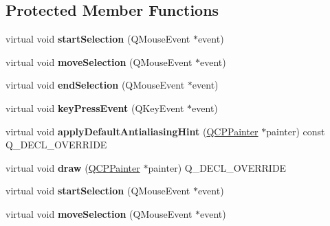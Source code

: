 \subsection*{Protected Member Functions}
\begin{DoxyCompactItemize}
\item 
virtual void {\bfseries start\+Selection} (Q\+Mouse\+Event $\ast$event)\hypertarget{class_q_c_p_selection_rect_a271f24cfca8bc50a0e2b4310ff90e227}{}\label{class_q_c_p_selection_rect_a271f24cfca8bc50a0e2b4310ff90e227}

\item 
virtual void {\bfseries move\+Selection} (Q\+Mouse\+Event $\ast$event)\hypertarget{class_q_c_p_selection_rect_a95c3f1700be2a6d7bba0fe56ece5fbb1}{}\label{class_q_c_p_selection_rect_a95c3f1700be2a6d7bba0fe56ece5fbb1}

\item 
virtual void {\bfseries end\+Selection} (Q\+Mouse\+Event $\ast$event)\hypertarget{class_q_c_p_selection_rect_a625bcffd73987f6de6c6559aaf29ab9d}{}\label{class_q_c_p_selection_rect_a625bcffd73987f6de6c6559aaf29ab9d}

\item 
virtual void {\bfseries key\+Press\+Event} (Q\+Key\+Event $\ast$event)\hypertarget{class_q_c_p_selection_rect_a1affe764316d6122a26fdb2e9583feb1}{}\label{class_q_c_p_selection_rect_a1affe764316d6122a26fdb2e9583feb1}

\item 
virtual void {\bfseries apply\+Default\+Antialiasing\+Hint} (\hyperlink{class_q_c_p_painter}{Q\+C\+P\+Painter} $\ast$painter) const Q\+\_\+\+D\+E\+C\+L\+\_\+\+O\+V\+E\+R\+R\+I\+DE\hypertarget{class_q_c_p_selection_rect_aa854697618e16037ba9c73056abfb9bf}{}\label{class_q_c_p_selection_rect_aa854697618e16037ba9c73056abfb9bf}

\item 
virtual void {\bfseries draw} (\hyperlink{class_q_c_p_painter}{Q\+C\+P\+Painter} $\ast$painter) Q\+\_\+\+D\+E\+C\+L\+\_\+\+O\+V\+E\+R\+R\+I\+DE\hypertarget{class_q_c_p_selection_rect_ab0e50ae796508bdcd97ab8c335c593bf}{}\label{class_q_c_p_selection_rect_ab0e50ae796508bdcd97ab8c335c593bf}

\item 
virtual void {\bfseries start\+Selection} (Q\+Mouse\+Event $\ast$event)\hypertarget{class_q_c_p_selection_rect_a3d1b0ef1fb16ecd130921d80cb022479}{}\label{class_q_c_p_selection_rect_a3d1b0ef1fb16ecd130921d80cb022479}

\item 
virtual void {\bfseries move\+Selection} (Q\+Mouse\+Event $\ast$event)\hypertarget{class_q_c_p_selection_rect_a651e9aa1e98455b19904ca72854a39d5}{}\label{class_q_c_p_selection_rect_a651e9aa1e98455b19904ca72854a39d5}


\end{DoxyCompactItemize}

